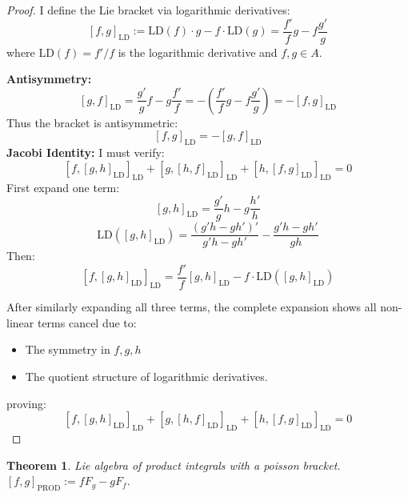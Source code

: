 \documentclass{artjlt}
\newtheorem{thm}{Theorem}
\newcommand{\?}{\textbackslash}
\begin{document}
\begin{proof}
I define the Lie bracket via logarithmic derivatives:
\[
[f,g]_{\text{LD}} := \text{LD}(f) \cdot g - f \cdot \text{LD}(g) = \frac{f'}{f}g - f\frac{g'}{g}
\]
where $\text{LD}(f) = f'/f$ is the logarithmic derivative and $f,g \in A$.

\noindent\textbf{Antisymmetry:}
\[
[g,f]_{\text{LD}} = \frac{g'}{g}f - g\frac{f'}{f} = -\left(\frac{f'}{f}g - f\frac{g'}{g}\right) = -[f,g]_{\text{LD}}
\]
Thus the bracket is antisymmetric:
\[
\boxed{[f,g]_{\text{LD}} = -[g,f]_{\text{LD}}} 
\]
\noindent\textbf{Jacobi Identity:}
I must verify:
\[
[f,[g,h]_{\text{LD}}]_{\text{LD}} + [g,[h,f]_{\text{LD}}]_{\text{LD}} + [h,[f,g]_{\text{LD}}]_{\text{LD}} = 0
\]
First expand one term:
\[
[g,h]_{\text{LD}} = \frac{g'}{g}h - g\frac{h'}{h}
\]
\[
\text{LD}([g,h]_{\text{LD}}) = \frac{(g'h - gh')'}{g'h - gh'} - \frac{g'h - gh'}{gh}
\]
Then:
\[
[f,[g,h]_{\text{LD}}]_{\text{LD}} = \frac{f'}{f}[g,h]_{\text{LD}} - f\cdot\text{LD}([g,h]_{\text{LD}})
\]

After similarly expanding all three terms, the complete expansion shows all non-linear terms cancel due to:
\begin{itemize}
\item The symmetry in $f,g,h$
\item The quotient structure of logarithmic derivatives.
\end{itemize}
proving:
\[
\boxed{[f,[g,h]_{\text{LD}}]_{\text{LD}} + [g,[h,f]_{\text{LD}}]_{\text{LD}} + [h,[f,g]_{\text{LD}}]_{\text{LD}} = 0} 
\]
\end{proof}
   \begin{thm}
      Lie algebra of product integrals with a poisson bracket. 
      $[f,g]_\text{PROD} := f F_g - g F_f$.
   \end{thm}
\end{document}
